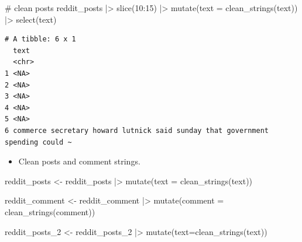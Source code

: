 \documentclass[
  letterpaper,
  DIV=11,
  numbers=noendperiod]{scrartcl}
\newenvironment{Shaded}{\begin{snugshade}}{\end{snugshade}}
\newcommand{\AttributeTok}[1]{\textcolor[rgb]{0.40,0.45,0.13}{#1}}
\newcommand{\CommentTok}[1]{\textcolor[rgb]{0.37,0.37,0.37}{#1}}
\newcommand{\DecValTok}[1]{\textcolor[rgb]{0.68,0.00,0.00}{#1}}
\newcommand{\FunctionTok}[1]{\textcolor[rgb]{0.28,0.35,0.67}{#1}}
\newcommand{\NormalTok}[1]{\textcolor[rgb]{0.00,0.23,0.31}{#1}}
\newcommand{\OtherTok}[1]{\textcolor[rgb]{0.00,0.23,0.31}{#1}}
\newcommand{\SpecialCharTok}[1]{\textcolor[rgb]{0.37,0.37,0.37}{#1}}
\providecommand{\tightlist}{%
  \setlength{\itemsep}{0pt}\setlength{\parskip}{0pt}}\usepackage{longtable,booktabs,array}
\begin{document}
\begin{Shaded}
\begin{Highlighting}[]
\CommentTok{\# clean posts}
\NormalTok{reddit\_posts }\SpecialCharTok{|\textgreater{}} 
  \FunctionTok{slice}\NormalTok{(}\DecValTok{10}\SpecialCharTok{:}\DecValTok{15}\NormalTok{) }\SpecialCharTok{|\textgreater{}} 
  \FunctionTok{mutate}\NormalTok{(}\AttributeTok{text =} \FunctionTok{clean\_strings}\NormalTok{(text)) }\SpecialCharTok{|\textgreater{}} 
  \FunctionTok{select}\NormalTok{(text) }
\end{Highlighting}
\end{Shaded}

\begin{verbatim}
# A tibble: 6 x 1
  text                                                                          
  <chr>                                                                         
1 <NA>                                                                          
2 <NA>                                                                          
3 <NA>                                                                          
4 <NA>                                                                          
5 <NA>                                                                          
6 commerce secretary howard lutnick said sunday that government spending could ~
\end{verbatim}

\begin{itemize}
\tightlist
\item
  Clean posts and comment strings.
\end{itemize}

\begin{Shaded}
\begin{Highlighting}[]
\NormalTok{reddit\_posts }\OtherTok{\textless{}{-}}\NormalTok{ reddit\_posts }\SpecialCharTok{|\textgreater{}} 
  \FunctionTok{mutate}\NormalTok{(}\AttributeTok{text =} \FunctionTok{clean\_strings}\NormalTok{(text))}

\NormalTok{reddit\_comment }\OtherTok{\textless{}{-}}\NormalTok{ reddit\_comment }\SpecialCharTok{|\textgreater{}} 
  \FunctionTok{mutate}\NormalTok{(}\AttributeTok{comment =} \FunctionTok{clean\_strings}\NormalTok{(comment))}

\NormalTok{reddit\_posts\_2 }\OtherTok{\textless{}{-}}\NormalTok{ reddit\_posts\_2 }\SpecialCharTok{|\textgreater{}} 
  \FunctionTok{mutate}\NormalTok{(}\AttributeTok{text=}\FunctionTok{clean\_strings}\NormalTok{(text))}
\end{Highlighting}
\end{Shaded}
\end{document}
